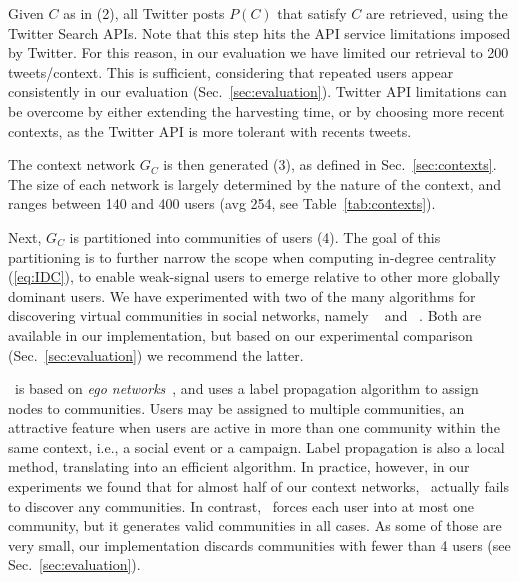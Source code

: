 %
Given $C$ as in (2), all Twitter posts $P(C)$ that satisfy $C$ are retrieved, using the Twitter Search APIs.
Note that this step hits the API service limitations imposed by Twitter. 
For this reason, in our evaluation we have limited our retrieval to 200 tweets/context. This is sufficient, considering that repeated users appear consistently in our evaluation (Sec.~\ref{sec:evaluation}). 
Twitter API limitations can be overcome by either extending the harvesting time, or by choosing more recent contexts, as the Twitter API is more tolerant with recents tweets.

%
The context network $G_C$ is then generated (3), as defined in Sec.~\ref{sec:contexts}.  %
The size of each network is largely determined by the nature of the context, and  ranges between 140 and 400 users (avg 254, see Table~\ref{tab:contexts}).


Next, $G_C$  is partitioned into communities of users (4).
The goal of this partitioning is to further narrow the scope when computing in-degree centrality (\ref{eq:IDC}), 
to enable weak-signal users to emerge relative to other more globally dominant users.
%
We have experimented with two of the many algorithms for discovering virtual communities in social networks, namely \demon~\cite{Coscia:2012:DLD:2339530.2339630} and  \infomap~\cite{INFOMAP}. 
Both are available in our implementation, but based on our experimental comparison (Sec.~\ref{sec:evaluation}) we recommend the latter.

\demon~is based on \textit{ego networks}~\cite{Arnaboldi2013}, and uses a label propagation algorithm to assign nodes to communities.  
Users may be assigned to multiple communities, an attractive feature when users are active in more than one community within the same context, i.e., a social event or a campaign.
Label propagation is also a local method, translating into an efficient algorithm.
In practice, however, in our experiments we found that for almost half of our context networks, \demon~actually fails to discover any communities.
%
In contrast, \infomap~forces each user into at most one community, but it generates valid communities in all cases. 
As some of those are very small, our  implementation discards communities with fewer than 4 users (see Sec.~\ref{sec:evaluation}).
%

